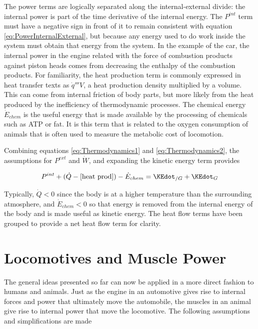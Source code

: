 The power terms are logically separated along the internal-external divide: the internal power is part of the time derivative of the internal energy. The $P^{int}$ term must have a negative sign in front of it to remain consistent with equation \ref{eq:PowerInternalExternal}, but because any energy used to do work inside the system must obtain that energy from the system. In the example of the car, the internal power in the engine related with the force of combustion products against piston heads comes from decreasing the enthalpy of the combustion products. For familiarity, the heat production term is commonly expressed in heat transfer texts as $\dot{q}'''V$, a heat production density multiplied by a volume. This can come from internal friction of body parts, but more likely from the heat produced by the inefficiency of thermodynamic processes. The chemical energy $\dot{E}_{chem}$ is the useful energy that is made available by the processing of chemicals such as ATP or fat. It is this term that is related to the oxygen consumption of animals that is often used to measure the metabolic cost of locomotion.

Combining equations \ref{eq:Thermodynamics1} and \ref{eq:Thermodynamics2}, the assumptions for $P^{ext}$ and $\dot{W}$, and expanding the kinetic energy term provides

\begin{equation}
P^{int} + (\dot{Q} - [\mbox{heat prod}]) - \dot{E}_{chem} = \KEdot_{/G} + \KEdot_{G}
\end{equation}

Typically, $\dot{Q} < 0$ since the body is at a higher temperature than the surrounding atmosphere, and $\dot{E}_{chem} < 0$ so that energy is removed from the internal energy of the body and is made useful as kinetic energy. The heat flow terms have been grouped to provide a net heat flow term for clarity.

\section{Locomotives and Muscle Power}
\label{sec:LocomotivesAndMusclePower}

The general ideas presented so far can now be applied in a more direct fashion to humans and animals. Just as the engine in an automotive gives rise to internal forces and power that ultimately move the automobile, the muscles in an animal give rise to internal power that move the locomotive. The following assumptions and simplifications are made

